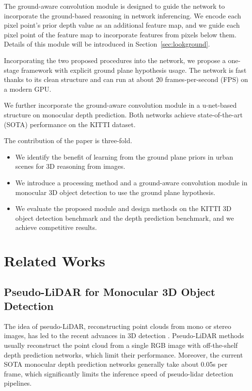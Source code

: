 \documentclass[letterpaper, 10 pt, journal, twoside]{IEEEtran}
\begin{document}
The ground-aware convolution module is designed to guide the network to incorporate the ground-based reasoning in network inferencing. We encode each pixel point's prior depth value as an additional feature map, and we guide each pixel point of the feature map to incorporate features from pixels below them. Details of this module will be introduced in Section~\ref{sec:lookground}.


Incorporating the two proposed procedures into the network, we propose a one-stage framework with explicit ground plane hypothesis usage. The network is fast thanks to its clean structure and can run at about 20 frames-per-second (FPS) on a modern GPU.

We further incorporate the ground-aware convolution module in a u-net-based structure on monocular depth prediction. Both networks achieve state-of-the-art (SOTA) performance on the KITTI dataset.

The contribution of the paper is three-fold.
\begin{itemize}
    \item We identify the benefit of learning from the ground plane priors in urban scenes for 3D reasoning from images.
    \item We introduce a processing method and a ground-aware convolution module in monocular 3D object detection to use the ground plane hypothesis.
    \item We evaluate the proposed module and design methods on the KITTI 3D object detection benchmark and the depth prediction benchmark, and we achieve competitive results.
\end{itemize}

 \section{Related Works}
\label{section:Relate}


\subsection{Pseudo-LiDAR for Monocular 3D Object Detection}
The idea of pseudo-LiDAR, reconstructing point clouds from mono or stereo images, has led to the recent advances in 3D detection \cite{wang2018pseudo}\cite{Ma2019AM3D}\cite{Vianney2019RefinedMPL}\cite{Weng2019Plidar}\cite{Ku2019MonoPSR}.
Pseudo-LiDAR methods usually reconstruct the point cloud from a single RGB image with off-the-shelf depth prediction networks, which limit their performance.
Moreover, the current SOTA monocular depth prediction networks generally take about 0.05s per frame, which significantly limits the inference speed of pseudo-lidar detection pipelines.
\end{document}

